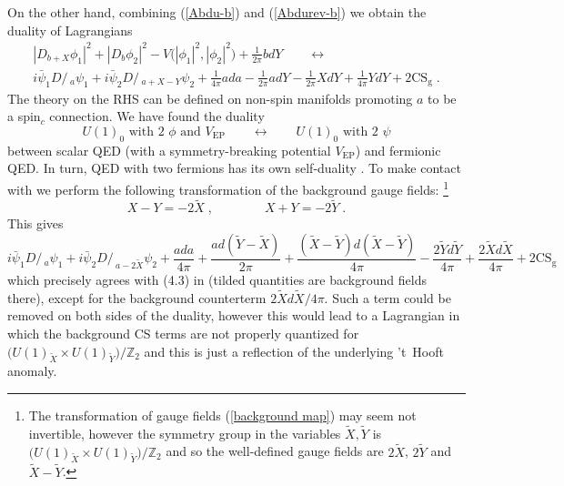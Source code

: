 \documentclass[a4paper, 12pt]{article}
\newcommand{\wt}{\widetilde}
\numberwithin{equation}{section}
\newcommand{\Dslash}{D\!\!\!\!\slash\,}
\newcommand{\be}{\begin{equation}} \newcommand{\ee}{\end{equation}}
\newcommand{\bZ}{\mathbb{Z}}
\begin{document}
On the other hand, combining (\ref{Abdu-b}) and (\ref{Abdurev-b}) we obtain the duality of Lagrangians
\begin{multline}
|D_{b+X}\phi_1|^2 + |D_b\phi_2|^2 - V\big( |\phi_1|^2, |\phi_2|^2 \big) + \frac1{2\pi} bdY \qquad\longleftrightarrow \\
i \bar\psi_1 \Dslash_a \psi_1 + i \bar\psi_2 \Dslash_{a+X-Y} \psi_2 + \frac1{4\pi} ada - \frac1{2\pi} adY - \frac1{2\pi} XdY + \frac1{4\pi} YdY + 2 \text{CS}_\text{g} \;.
\end{multline}
The theory on the RHS can be defined on non-spin manifolds promoting $a$ to be a spin$_c$ connection.
We have found the duality
\be
U(1)_0 \text{ with 2 $\phi$ and $V_\text{EP}$} \qquad\longleftrightarrow\qquad U(1)_0 \text{ with 2 $\psi$}
\ee
between scalar QED (with a symmetry-breaking potential $V_\text{EP}$) and fermionic QED. In turn, QED with two fermions has its own self-duality \cite{Xu:2015lxa, Hsin:2016blu, Benini:2017dus}. To make contact with \cite{Hsin:2016blu, Benini:2017dus} we perform the following transformation of the background gauge fields:%
\footnote{The transformation of gauge fields (\ref{background map}) may seem not invertible, however the symmetry group in the variables $\wt X, \wt Y$ is $\big( U(1)_{\wt X} \times U(1)_{\wt Y} \big)/\bZ_2$ and so the well-defined gauge fields are $2\wt X$, $2\wt Y$ and $\wt X-\wt Y$.}
\be
\label{background map}
X - Y = -2 \wt X \;,\qquad\qquad X+Y = - 2 \wt Y \;.
\ee
This gives
\be
i \bar\psi_1 \Dslash_a \psi_1 + i \bar\psi_2 \Dslash_{a-2\wt X} \psi_2 + \frac{ada}{4\pi} + \frac{ad(\wt Y-\wt X)}{2\pi} + \frac{(\wt X-\wt Y)d(\wt X-\wt Y)}{4\pi} - \frac{2\wt Yd\wt Y}{4\pi} + \frac{2\wt Xd\wt X}{4\pi} + 2 \text{CS}_\text{g}
\ee
which precisely agrees with (4.3) in \cite{Benini:2017dus} (tilded quantities are background fields there), except for the background counterterm $2\wt Xd\wt X/4\pi$. Such a term could be removed on both sides of the duality, however this would lead to a Lagrangian in which the background CS terms are not properly quantized for $\big(U(1)_{\wt X} \times U(1)_{\wt Y} \big)/\bZ_2$ and this is just a reflection of the underlying 't~Hooft anomaly.
\end{document}

